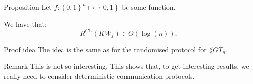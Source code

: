 \documentclass[a4paper]{article}
\begin{document}
\begin{parag}{Proposition}
    Let $f: \left\{0, 1\right\}^n \mapsto \left\{0, 1\right\}$ be some function.

    We have that:
    \[R^{CC}\left(KW_f\right) \in O\left(\log\left(n\right)\right),\]

    \begin{subparag}{Proof idea}
        The idea is the same as for the randomised protocol for $\lang{GT}_n$. 
    \end{subparag}

    \begin{subparag}{Remark}
        This is not so interesting. This shows that, to get interesting results, we really need to consider deterministic communication protocols.
    \end{subparag}
\end{parag}
\end{document}
